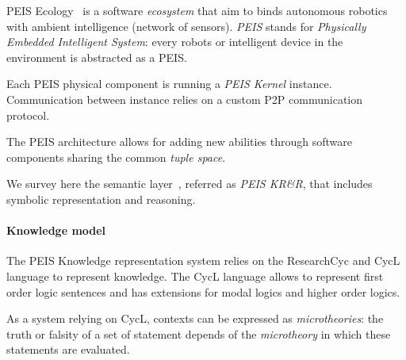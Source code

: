 \documentclass[a4paper, twocolumn]{article}
\begin{document}
{\sc PEIS Ecology}~\cite{Saffiotti2005} is a software \emph{ecosystem} that aim to binds autonomous
robotics with ambient intelligence (network of sensors). \emph{PEIS} stands for
\emph{Physically Embedded Intelligent System}: every robots or intelligent
device in the environment is abstracted as a PEIS.

Each PEIS physical component is running a \emph{PEIS Kernel} instance. Communication
between instance relies on a custom P2P communication protocol.

The PEIS architecture allows for adding new abilities through software components sharing the common \emph{tuple space}.

We survey here the semantic layer~\cite{Daoutis2009}, referred as \emph{PEIS KR\&R}, that includes symbolic representation and reasoning.


\paragraph{Knowledge model} The PEIS Knowledge representation system relies on
the {\sc ResearchCyc} and {\sc CycL} language to represent knowledge. The {\sc CycL} language
allows to represent first order logic sentences and has extensions for modal logics and higher order logics.


As a system relying on {\sc CycL}, contexts can be expressed as
\emph{microtheories}: the truth or falsity of a set of statement depends of the
\emph{microtheory} in which these statements are evaluated.
\end{document}
